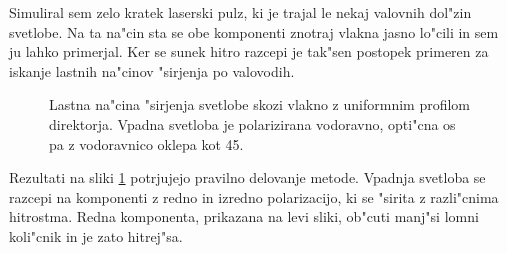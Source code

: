 \documentclass[a4paper,10pt]{article}
\begin{document}
Simuliral sem zelo kratek laserski pulz, ki je trajal le nekaj valovnih dol"zin svetlobe. 
Na ta na"cin sta se obe komponenti znotraj vlakna jasno lo"cili in sem ju lahko primerjal. 
Ker se sunek hitro razcepi je tak"sen postopek primeren za iskanje lastnih na"cinov "sirjenja po valovodih\cite{taflove}. 

\begin{figure}[!htbp]
 \centering
 \caption{Lastna na"cina "sirjenja svetlobe skozi vlakno z uniformnim profilom direktorja. Vpadna svetloba je polarizirana vodoravno, opti"cna os pa z vodoravnico oklepa kot 45\degree. }
 \label{fig:pulse-0-mode}
\end{figure}

Rezultati na sliki \ref{fig:pulse-0-mode} potrjujejo pravilno delovanje metode. 
Vpadnja svetloba se razcepi na komponenti z redno in izredno polarizacijo, ki se "sirita z razli"cnima hitrostma. 
Redna komponenta, prikazana na levi sliki, ob"cuti manj"si lomni koli"cnik in je zato hitrej"sa. 
\end{document}
